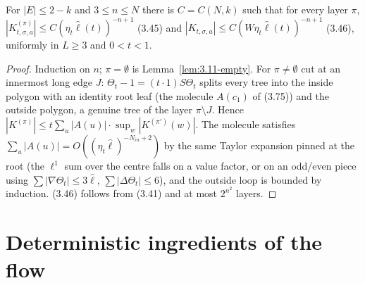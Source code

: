\begin{lemma}\label{lem:3.11}
  \leanok{}
  For $|E|\le2-k$ and $3\le n\le N$ there is $C=C(N,k)$ such that for every layer $\pi$,
  $|K^{(\pi)}_{t,\sigma,a}|\le C(\eta_t\hat\ell(t))^{-n+1}$ (3.45) and
  $|K_{t,\sigma,a}|\le C(W\eta_t\hat\ell(t))^{-n+1}$ (3.46), uniformly in $L\ge3$ and $0<t<1$.
\end{lemma}
\begin{proof}\leanok{}
  Induction on $n$; $\pi=\emptyset$ is Lemma~\ref{lem:3.11-empty}.  For $\pi\ne\emptyset$ cut at an
  innermost long edge $J$: $\Theta_t-1=(t\cdot1)S\Theta_t$ splits every tree into the inside
  polygon with an identity root leaf (the molecule $A(c_1)$ of (3.75)) and the outside polygon, a
  genuine tree of the layer $\pi\setminus J$.  Hence
  $|K^{(\pi)}|\le t\sum_u|A(u)|\cdot\sup_w|K^{(\pi')}(w)|$.  The molecule satisfies
  $\sum_u|A(u)|=O((\eta_t\hat\ell)^{-N_{in}+2})$ by the same Taylor expansion pinned at the root
  (the $\ell^1$ sum over the centre falls on a value factor, or on an odd/even piece using
  $\sum|\nabla\Theta_t|\le3\hat\ell$, $\sum|\Delta\Theta_t|\le6$), and the outside loop is bounded by
  induction.  (3.46) follows from (3.41) and at most $2^{n^2}$ layers.
\end{proof}

\chapter{Deterministic ingredients of the flow}

